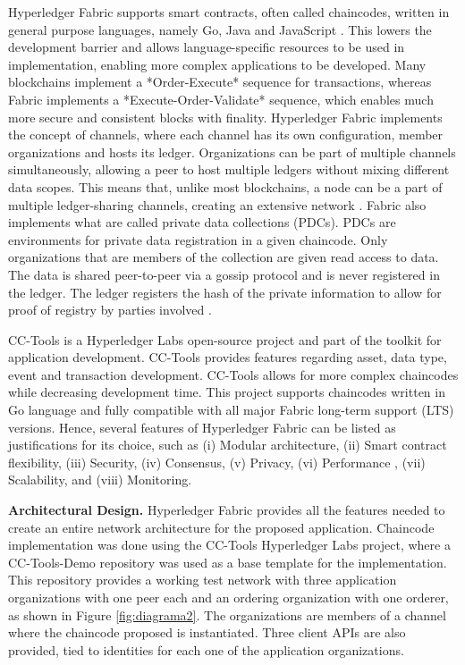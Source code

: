 Hyperledger Fabric supports smart contracts, often called chaincodes, written in general purpose languages, namely Go, Java and JavaScript \cite{fabric-article}. This lowers the development barrier and allows language-specific resources to be used in implementation, enabling more complex applications to be developed.
 Many blockchains implement a *Order-Execute* sequence for transactions, whereas Fabric implements a *Execute-Order-Validate* sequence, which enables much more secure and consistent blocks with finality. Hyperledger Fabric implements the concept of channels, where each channel has its own configuration, member organizations and hosts its ledger. Organizations can be part of multiple channels simultaneously, allowing a peer to host multiple ledgers without mixing different data scopes. This means that, unlike most blockchains, a node can be a part of multiple ledger-sharing channels, creating an extensive network \cite{fabric-article}. Fabric also implements what are called private data collections (PDCs). PDCs are environments for private data registration in a given chaincode. Only organizations that are members of the collection are given read access to data. The data is shared peer-to-peer via a gossip protocol and is never registered in the ledger. The ledger registers the hash of the private information to allow for proof of registry by parties involved \cite{fabric-article}. %

CC-Tools is a Hyperledger Labs open-source project and part of the toolkit for application development. CC-Tools provides features regarding asset, data type, event and transaction development. CC-Tools allows for more complex chaincodes while decreasing development time. This project supports chaincodes written in Go language and fully compatible with all major Fabric long-term support (LTS) versions. Hence, several features of Hyperledger Fabric can be listed as justifications for its choice, such as (i) Modular architecture, (ii) Smart contract flexibility, (iii) Security, (iv) Consensus, (v) Privacy, (vi) Performance \cite{Hyperledger2023Benchmarking}, (vii) Scalability, and (viii) Monitoring.

\noindent\textbf{Architectural Design.} Hyperledger Fabric provides all the features needed to create an entire network architecture for the proposed application. Chaincode implementation was done using the CC-Tools Hyperledger Labs project, where a CC-Tools-Demo repository was used as a base template for the implementation. This repository provides a working test network with three application organizations with one peer each and an ordering organization with one orderer, as shown in Figure \ref{fig:diagrama2}. The organizations are members of a channel where the chaincode proposed is instantiated. Three client APIs are also provided, tied to identities for each one of the application organizations.


